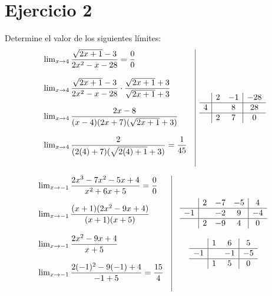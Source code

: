 \documentclass[12pt]{article}
\begin{document}
\section*{Ejercicio 2}
\noindent Determine el valor de los siguientes límites:
\[
\begin{array}{l|c}
  \begin{array}{l}
    \lim_{x \to 4} \dfrac{\sqrt{2x+1} - 3}{2x^2-x-28} = \dfrac{0}{0} \\\\
    \lim_{x \to 4} \dfrac{\sqrt{2x+1}-3}{2x^2-x-28} \cdot \dfrac{\sqrt{2x+1}+3}{\sqrt{2x+1}+3} \\\\
    \lim_{x \to 4} \dfrac{2x-8}{(x-4)(2x+7)(\sqrt{2x+1}+3)} \\\\
    \lim_{x \to 4} \dfrac{2}{(2(4)+7)(\sqrt{2(4)+1}+3)} = \dfrac{1}{45} \\\\
  \end{array}
  &
  \begin{array}{c|c c|c}
    & 2 & -1 & -28 \\
    \hline
    4 &  & 8  & 28 \\
    \hline
    & 2 & 7  & 0 \\
  \end{array}
\end{array}
\]

\[
\begin{array}{l|c}
  \begin{array}{l}
    \lim_{x \to -1} \dfrac{2x^3 - 7x^2 - 5x + 4}{x^2 + 6x + 5} = \dfrac{0}{0} \\\\
    \lim_{x \to -1} \dfrac{(x+1)(2x^2 - 9x + 4)}{(x+1)(x+5)} \\\\
    \lim_{x \to -1} \dfrac{2x^2 - 9x + 4}{x+5} \\\\
    \lim_{x \to -1} \dfrac{2(-1)^2 - 9(-1) + 4}{-1 + 5} = \dfrac{15}{4} \\\\
  \end{array}
  &
  \begin{array}{c}
    \begin{array}{c|c c c|c}
      & 2 & -7 & -5 & 4 \\
      \hline
      -1 &  & -2 & 9 & -4 \\
      \hline
      & 2 & -9 & 4 & 0 \\
    \end{array} \\\\
    \begin{array}{c|c c|c}
      & 1 & 6 & 5 \\
      \hline
      -1 &  & -1 & -5 \\
      \hline
      & 1 & 5 & 0 \\
    \end{array}
  \end{array}
\end{array}
\]
\end{document}
